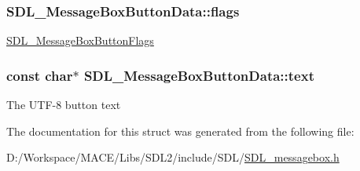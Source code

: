 \subsubsection[{\texorpdfstring{flags}{flags}}]{ S\+D\+L\+\_\+\+Message\+Box\+Button\+Data\+::flags}\hypertarget{struct_s_d_l___message_box_button_data_a426c8b5da0e718242c7840706d95de0b}{}\label{struct_s_d_l___message_box_button_data_a426c8b5da0e718242c7840706d95de0b}
\hyperlink{_s_d_l__messagebox_8h_ad21beffe204426be6efbf4990c916ad0}{S\+D\+L\+\_\+\+Message\+Box\+Button\+Flags} 
\subsubsection[{\texorpdfstring{text}{text}}]{\setlength{\rightskip}{0pt plus 5cm}const char$\ast$ S\+D\+L\+\_\+\+Message\+Box\+Button\+Data\+::text}\hypertarget{struct_s_d_l___message_box_button_data_af35f3062f0577159284c8828caaf08e4}{}\label{struct_s_d_l___message_box_button_data_af35f3062f0577159284c8828caaf08e4}
The U\+T\+F-\/8 button text 

The documentation for this struct was generated from the following file\+:\begin{DoxyCompactItemize}
\item 
D\+:/\+Workspace/\+M\+A\+C\+E/\+Libs/\+S\+D\+L2/include/\+S\+D\+L/\hyperlink{_s_d_l__messagebox_8h}{S\+D\+L\+\_\+messagebox.\+h}\end{DoxyCompactItemize}

